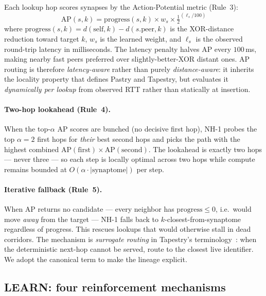 \documentclass[conference]{IEEEtran}
\newcommand{\nhone}{NH-1\xspace}
\begin{document}
Each lookup hop scores synapses by the Action-Potential metric (Rule~3):
\begin{equation}
\mathrm{AP}(s, k) = \mathrm{progress}(s, k) \times w_s \times \tfrac{1}{2}^{(\ell_s / 100)}
\label{eq:ap}
\end{equation}
where $\mathrm{progress}(s, k) = d(\mathrm{self}, k) - d(s.\mathrm{peer}, k)$
is the XOR-distance reduction toward target $k$, $w_s$ is the learned
weight, and $\ell_s$ is the observed round-trip latency in milliseconds.
The latency penalty halves AP every $100$\,ms, making nearby fast peers
preferred over slightly-better-XOR distant ones. AP routing is therefore
\emph{latency-aware} rather than purely \emph{distance-aware}: it inherits
the locality property that defines Pastry and Tapestry, but evaluates it
\emph{dynamically per lookup} from observed RTT rather than statically at
insertion.

\paragraph{Two-hop lookahead (Rule~4).}
When the top-$\alpha$ AP scores are bunched (no decisive first hop),
\nhone probes the top $\alpha = 2$ first hops for \emph{their} best
second hops and picks the path with the highest combined
$\mathrm{AP}(\mathrm{first}) \times \mathrm{AP}(\mathrm{second})$. The
lookahead is exactly two hops --- never three --- so each step is
locally optimal across two hops while compute remains bounded at
$O(\alpha \cdot |\mathrm{synaptome}|)$ per step.

\paragraph{Iterative fallback (Rule~5).}
When AP returns no candidate --- every neighbor has $\mathrm{progress} \le 0$,
i.e.\ would move \emph{away} from the target --- \nhone falls back to
$k$-closest-from-synaptome regardless of progress. This rescues lookups
that would otherwise stall in dead corridors. The mechanism is \emph{surrogate
routing} in Tapestry's terminology~\cite{zhao2004tapestry}: when the
deterministic next-hop cannot be served, route to the closest live
identifier. We adopt the canonical term to make the lineage explicit.

\subsection{LEARN: four reinforcement mechanisms}
\label{sec:nh1-learn}
\end{document}
